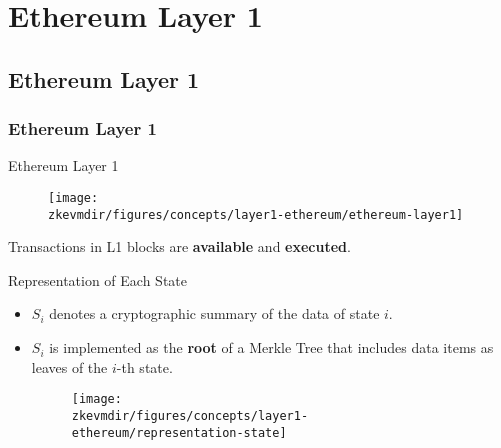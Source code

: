 

\renewcommand{\mytitle}{Ethereum Layer 1}
\ifZEROSEC \fi
\ifSEC \section{\mytitle{}}\fi
\ifSUBSEC \subsection{\mytitle{}}\fi
\ifSUBSUBSEC \subsubsection{\mytitle{}}\fi



\begin{frame}{Ethereum Layer 1}
\begin{figure}[H]
\texttt{[image: \\zkevmdir/figures/concepts/layer1-ethereum/ethereum-layer1]}
\end{figure}
\centering
Transactions in L1 blocks are \textbf{available} and \textbf{executed}.
\end{frame}




\begin{frame} {Representation of Each State}
  \begin{itemize}
    \item $S_i$ denotes a cryptographic summary of the data of state $i$.
    \item $S_i$ is implemented as the \textbf{root} of a Merkle Tree 
    that includes data items as leaves of the $i$-th state.
    \newline
    \begin{figure}[H]
      \centering
      \texttt{[image: \\zkevmdir/figures/concepts/layer1-ethereum/representation-state]}
    \end{figure}
  \end{itemize}
\end{frame}